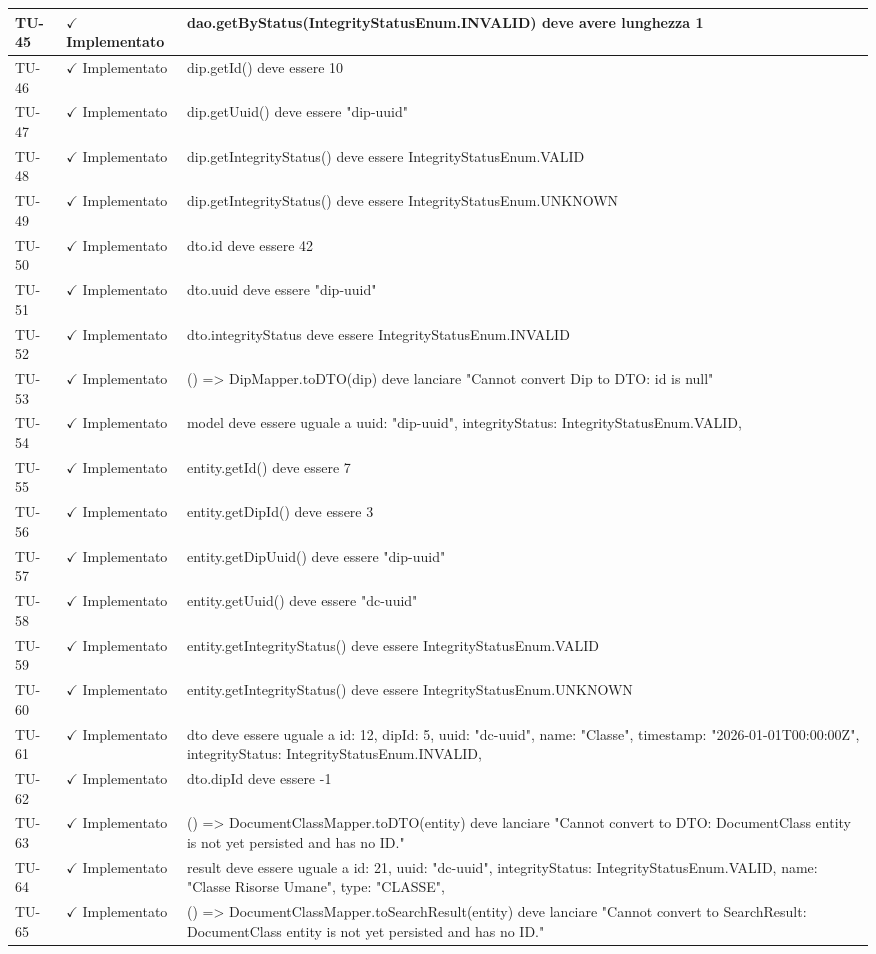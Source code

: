 ﻿\documentclass[a4paper,12pt]{article}
\newcommand{\ok}{\textcolor{green!60!black}{$\checkmark$ Implementato}}
\begin{document}
\begin{longtable}{|p{2cm}|p{3.5cm}|p{9.5cm}|}
\hline
TU-45 & \ok & dao.getByStatus(IntegrityStatusEnum.INVALID) deve avere lunghezza 1 \\
\hline
TU-46 & \ok & dip.getId() deve essere 10 \\
\hline
TU-47 & \ok & dip.getUuid() deve essere "dip-uuid" \\
\hline
TU-48 & \ok & dip.getIntegrityStatus() deve essere IntegrityStatusEnum.VALID \\
\hline
TU-49 & \ok & dip.getIntegrityStatus() deve essere IntegrityStatusEnum.UNKNOWN \\
\hline
TU-50 & \ok & dto.id deve essere 42 \\
\hline
TU-51 & \ok & dto.uuid deve essere "dip-uuid" \\
\hline
TU-52 & \ok & dto.integrityStatus deve essere IntegrityStatusEnum.INVALID \\
\hline
TU-53 & \ok & () => DipMapper.toDTO(dip) deve lanciare "Cannot convert Dip to DTO: id is null" \\
\hline
TU-54 & \ok & model deve essere uguale a { uuid: "dip-uuid", integrityStatus: IntegrityStatusEnum.VALID, } \\
\hline
TU-55 & \ok & entity.getId() deve essere 7 \\
\hline
TU-56 & \ok & entity.getDipId() deve essere 3 \\
\hline
TU-57 & \ok & entity.getDipUuid() deve essere "dip-uuid" \\
\hline
TU-58 & \ok & entity.getUuid() deve essere "dc-uuid" \\
\hline
TU-59 & \ok & entity.getIntegrityStatus() deve essere IntegrityStatusEnum.VALID \\
\hline
TU-60 & \ok & entity.getIntegrityStatus() deve essere IntegrityStatusEnum.UNKNOWN \\
\hline
TU-61 & \ok & dto deve essere uguale a { id: 12, dipId: 5, uuid: "dc-uuid", name: "Classe", timestamp: "2026-01-01T00:00:00Z", integrityStatus: IntegrityStatusEnum.INVALID, } \\
\hline
TU-62 & \ok & dto.dipId deve essere -1 \\
\hline
TU-63 & \ok & () => DocumentClassMapper.toDTO(entity) deve lanciare "Cannot convert to DTO: DocumentClass entity is not yet persisted and has no ID." \\
\hline
TU-64 & \ok & result deve essere uguale a { id: 21, uuid: "dc-uuid", integrityStatus: IntegrityStatusEnum.VALID, name: "Classe Risorse Umane", type: "CLASSE", } \\
\hline
TU-65 & \ok & () => DocumentClassMapper.toSearchResult(entity) deve lanciare "Cannot convert to SearchResult: DocumentClass entity is not yet persisted and has no ID." \\

\end{longtable}
\end{document}
